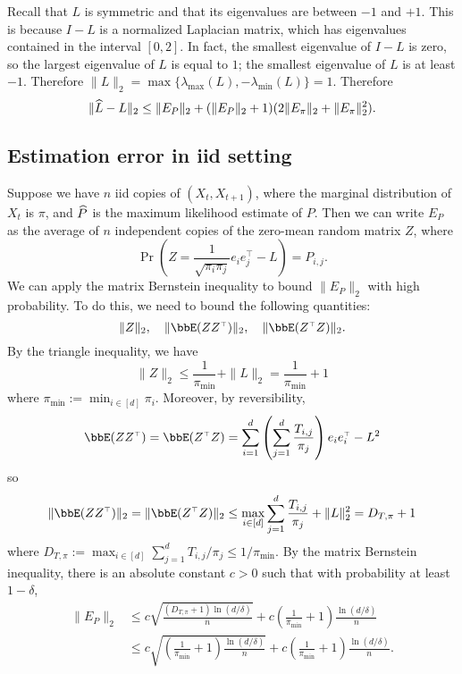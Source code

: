 \documentclass[11pt]{article}
\theoremstyle{plain}
\theoremstyle{definition}
\theoremstyle{remark}
\newcommand\wh{\ensuremath{\widehat}}
\newcommand\Parens[1]{\left( #1 \right)}
\renewcommand\t{{\ensuremath{\scriptscriptstyle{\top}}}}
\begin{document}
Recall that $L$ is symmetric and that its eigenvalues are between $-1$
and $+1$.
This is because $I - L$ is a normalized Laplacian matrix, which has
eigenvalues contained in the interval $[0,2]$.
In fact, the smallest eigenvalue of $I - L$ is zero, so the largest
eigenvalue of $L$ is equal to $1$; the smallest eigenvalue of $L$ is
at least $-1$.
Therefore $\|L\|_2 = \max\{\lambda_{\max}(L),-\lambda_{\min}(L)\} =
1$.
Therefore
\[
  \|\wh{L} - L\|_2
  \leq \|E_P\|_2 + (\|E_P\|_2 + 1) (2\|E_\pi\|_2 + \|E_\pi\|_2^2)
  .
\]

\subsection{Estimation error in iid setting}

Suppose we have $n$ iid copies of $(X_t,X_{t+1})$, where the marginal
distribution of $X_t$ is $\pi$, and $\wh{P}$ is the maximum likelihood
estimate of $P$.
Then we can write $E_P$ as the average of $n$ independent copies of the
zero-mean random matrix $Z$, where
\[
  \Pr\Parens{ Z = \frac1{\sqrt{\pi_i\pi_j}} e_i e_j^\t - L } = P_{i,j} .
\]
We can apply the matrix Bernstein inequality to bound $\|E_P\|_2$ with
high probability.
To do this, we need to bound the following quantities:
\[
  \|Z\|_2 , \quad
  \|\bbE(ZZ^\t)\|_2 , \quad
  \|\bbE(Z^\t Z)\|_2 .
\]
By the triangle inequality, we have
\[
  \|Z\|_2
  \leq \frac{1}{\pi_{\min}} + \|L\|_2
  = \frac{1}{\pi_{\min}} + 1
\]
where $\pi_{\min} := \min_{i\in[d]} \pi_i$.
Moreover, by reversibility,
\[
  \bbE(ZZ^\t)
  = \bbE(Z^\t Z)
  = \sum_{i=1}^d \Parens{ \sum_{j=1}^d \frac{T_{i,j}}{\pi_j} }
  e_ie_i^\t - L^2
\]
so
\[
  \|\bbE(ZZ^\t)\|_2
  = \|\bbE(Z^\t Z)\|_2
  \leq \max_{i \in [d]} \sum_{j=1}^d \frac{T_{i,j}}{\pi_j} + \|L\|_2^2
  = D_{T,\pi} + 1
\]
where $D_{T,\pi} := \max_{i\in[d]} \sum_{j=1}^d T_{i,j} / \pi_j \leq
1/\pi_{\min}$.
By the matrix Bernstein inequality, there is an absolute constant
$c>0$ such that with probability at least $1-\delta$,
\begin{align*}
  \|E_P\|_2
  & \leq c \sqrt{\frac{(D_{T,\pi} + 1) \ln(d/\delta)}{n}}
  + c \Parens{ \frac1{\pi_{\min}} + 1 } \frac{\ln(d/\delta)}{n}
  \\
  & \leq c \sqrt{\Parens{ \frac1{\pi_{\min}} + 1 }\frac{\ln(d/\delta)}{n}}
  + c \Parens{ \frac1{\pi_{\min}} + 1 } \frac{\ln(d/\delta)}{n}
  .
\end{align*}



\end{document}
